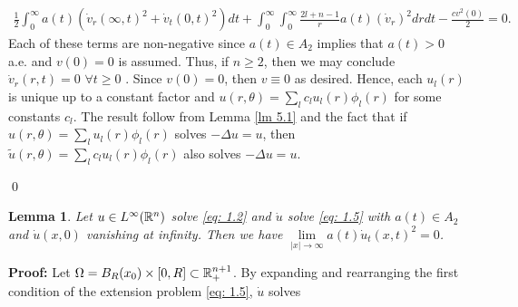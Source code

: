 \documentclass{article}
\newtheorem{lemma}[theorem]{Lemma}
\begin{document}

\begin{align*}
    \frac{1}{2}\int_{0}^{\infty} a(t) (\dot{v}_r(\infty, t)^2 + \dot{v}_t(0, t)^2) dt+ \int_{0}^{\infty}\int_{0}^{\infty} \frac{2l+n-1}{r}a(t) (\dot{v}_r)^2 drdt  - \frac{cv^2(0)}{2}= 0.
    \tag{5.6} \label{eq: 5.6}
\end{align*}
Each of these terms are non-negative since $a(t) \in A_2$ implies 
that $a(t)> 0$ a.e. and $v(0)=0$ is assumed. Thus, if $n \ge 2$, then we may conclude $\dot{v}_r(r,t) = 0$ $\forall t \ge 0$ . Since $v(0)=0$, then $v \equiv 0$ as desired. Hence, each $u_l(r)$ is unique up to a constant factor and $u(r, \theta)= \sum_l c_l u_l(r)\phi_l(r)$ for some constants $c_l$. The result follow from Lemma \ref{lm 5.1} and the fact that if $u(r, \theta) = \sum_l u_l(r)\phi_l(r) $ solves $-\Delta u = u$, then $\tilde{u}(r, \theta)= \sum_l c_l u_l(r)\phi_l(r)$ also solves $-\Delta u = u$.

\qed


\begin{lemma}
\label{lm 5.3}
Let $u \in L^\infty(\mathbb{R}^n)$ solve \eqref{eq: 1.2} and $\dot{u}$ solve \eqref{eq: 1.5} with $a(t) \in A_2$ and $\dot{u}(x,0)$ vanishing at infinity. Then we have $\lim\limits_{|x| \to \infty}a(t)\dot{u}_t(x, t)^2=0$.
\end{lemma}

\noindent
\textbf{Proof:}
Let $\Omega=B_R(x_0) \times [0,R] \subset \mathbb{R}^{n+1}_+$. By expanding and rearranging the first condition of the extension problem \eqref{eq: 1.5}, $\dot{u}$ solves 
\end{document}

